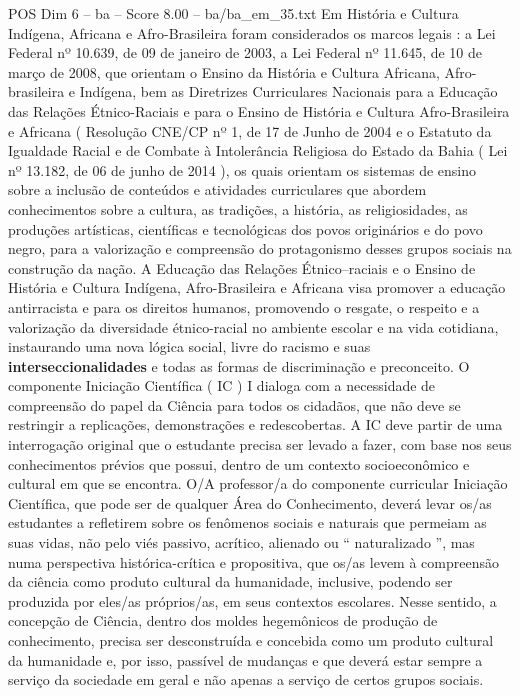 \begin{textsample}{POS Dim 6 – ba – Score 8.00 – ba/ba\_em\_35.txt}
Em História e Cultura Indígena, Africana e Afro-Brasileira foram considerados os marcos legais : a Lei Federal nº 10.639, de 09 de janeiro de 2003, a Lei Federal nº 11.645, de 10 de março de 2008, que orientam o Ensino da História e Cultura Africana, Afro-brasileira e Indígena, bem as Diretrizes Curriculares Nacionais para a Educação das Relações Étnico-Raciais e para o Ensino de História e Cultura Afro-Brasileira e Africana ( Resolução CNE/CP nº 1, de 17 de Junho de 2004 e o Estatuto da Igualdade Racial e de Combate à Intolerância Religiosa do Estado da Bahia ( Lei nº 13.182, de 06 de junho de 2014 ), os quais orientam os sistemas de ensino sobre a inclusão de conteúdos e atividades curriculares que abordem conhecimentos sobre a cultura, as tradições, a história, as religiosidades, as produções artísticas, científicas e tecnológicas dos povos originários e do povo negro, para a valorização e compreensão do protagonismo desses grupos sociais na construção da nação.
A Educação das Relações Étnico–raciais e o Ensino de História e Cultura Indígena, Afro-Brasileira e Africana visa promover a educação antirracista e para os direitos humanos, promovendo o resgate, o respeito e a valorização da diversidade étnico-racial no ambiente escolar e na vida cotidiana, instaurando uma nova lógica social, livre do racismo e suas \textbf{interseccionalidades} e todas as formas de discriminação e preconceito.
O componente Iniciação Científica ( IC ) I dialoga com a necessidade de compreensão do papel da Ciência para todos os cidadãos, que não deve se restringir a replicações, demonstrações e redescobertas.
A IC deve partir de uma interrogação original que o estudante precisa ser levado a fazer, com base nos seus conhecimentos prévios que possui, dentro de um contexto socioeconômico e cultural em que se encontra.
O/A professor/a do componente curricular Iniciação Científica, que pode ser de qualquer Área do Conhecimento, deverá levar os/as estudantes a refletirem sobre os fenômenos sociais e naturais que permeiam as suas vidas, não pelo viés passivo, acrítico, alienado ou “ naturalizado ”, mas numa perspectiva histórica-crítica e propositiva, que os/as levem à compreensão da ciência como produto cultural da humanidade, inclusive, podendo ser produzida por eles/as próprios/as, em seus contextos escolares.
Nesse sentido, a concepção de Ciência, dentro dos moldes hegemônicos de produção de conhecimento, precisa ser desconstruída e concebida como um produto cultural da humanidade e, por isso, passível de mudanças e que deverá estar sempre a serviço da sociedade em geral e não apenas a serviço de certos grupos sociais.

\end{textsample}
